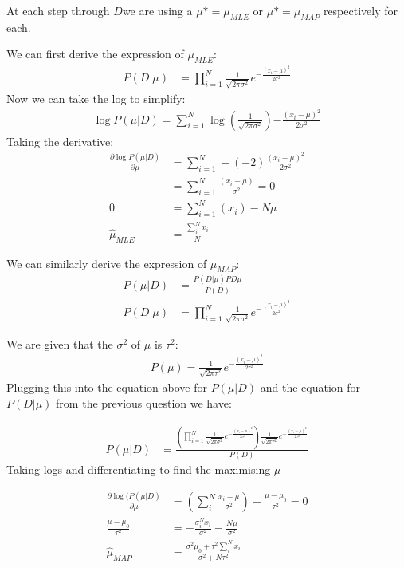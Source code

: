 \documentclass[submit]{harvardml}
\begin{document}
\begin{enumerate}
    At each step through $D$we are using a $\mu* = \mu_{MLE}$ or $\mu* = \mu_{MAP}$ respectively for each.
    
    We can first derive the expression of $\mu_{MLE}$:
    \begin{align*}
        P(D | \mu) &= \prod^N_{i=1} \frac{1}{\sqrt{2 \pi \sigma^2}} e ^{- \frac{(x_i - \mu)^2}{2\sigma^2}}
    \end{align*}
    Now we can take the log to simplify:
    \begin{align*}
        \log{P(\mu | D)} = \sum^N_{i=1} \log(\frac{1}{\sqrt{2 \pi \sigma^2}}) {- \frac{(x_i - \mu)^2}{2\sigma^2}}
    \end{align*}
    Taking the derivative:
    \begin{align*}
        \frac{\partial \log{P(\mu | D)}}{\partial \mu} &= \sum^N_{i=1}  - (-2) \frac{(x_i - \mu)^2}{2\sigma^2} \\
        &= \sum^N_{i=1}  \frac{(x_i - \mu)}{\sigma^2} = 0 \\
        0 &= \sum^N_{i=1} (x_i) - N\mu \\
        \hat{\mu}_{MLE} &= \frac{\sum^N_i x_i}{N}
    \end{align*}
    
    We can similarly derive the expression of $\mu_{MAP}$:
    \begin{align*}
        P(\mu | D) &= \frac{P(D| \mu) PD\mu}{P(D)}\\
        P(D | \mu) &= \prod^N_{i=1} \frac{1}{\sqrt{2 \pi \sigma^2}} e ^{- \frac{(x_i - \mu)^2}{2\sigma^2}}
    \end{align*}
    
    We are given that the $\sigma^2$ of $\mu$ is $\tau^2$:
    \begin{align*}
         P(\mu) = \frac{1}{\sqrt{2 \pi \tau^2}} e ^{- \frac{(x_i - \mu)^2}{2\tau^2}}
    \end{align*}
    Plugging this into the equation above for $P(\mu | D)$ and the equation for $P(D | \mu)$ from the previous question we have:
    
    \begin{align*}
        P(\mu | D) &= \frac{ \left( \prod^N_{i=1} \frac{1}{\sqrt{2 \pi \sigma^2}} e ^{- \frac{(x_i - \mu)^2}{2\sigma^2}} \right) \frac{1}{\sqrt{2 \pi \tau^2}} e ^{- \frac{(x_i - \mu)^2}{2\tau^2}} }{P(D)}
    \end{align*}
    Taking logs and differentiating to find the maximising $\mu$
    
    \begin{align*}
        \frac{\partial \log (P(\mu | D)}{\partial \mu} & = \left( \sum^N_i \frac{x_i - \mu}{\sigma^2}\right) - \frac{\mu - \mu_0}{\tau^2} = 0 \\
        \frac{\mu - \mu_0}{\tau^2} &= - \frac{\sigma^N_i x_i}{\sigma^2} - \frac{N\mu}{\sigma^2} \\
        \hat{\mu}_{MAP} &= \frac{\sigma^2 \mu_0 + \tau^2 \sum _i^N x_i}{\sigma^2 + N\tau^2}
    \end{align*}
    

\end{enumerate}
\end{document}
